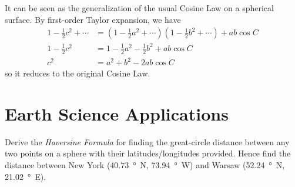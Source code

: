 It can be seen as the generalization of the usual Cosine Law on a spherical surface. By first-order Taylor expansion, we have
\begin{align*}
1-\frac{1}{2}c^2 + \cdots &= (1-\frac{1}{2}a^2 + \cdots)(1-\frac{1}{2}b^2 + \cdots) + ab \cos C \\
1-\frac{1}{2}c^2 &= 1 - \frac{1}{2}a^2 - \frac{1}{2} b^2 + ab \cos C \\
c^2 &= a^2 + b^2 - 2ab \cos C
\end{align*}
so it reduces to the original Cosine Law.

\section{Earth Science Applications}
\begin{exmp}
\label{exmp:Haversine}
Derive the \textit{Haversine Formula} for finding the great-circle distance between any two points on a sphere with their latitudes/longitudes provided. Hence find the distance between New York (\SI{40.73}{\degree N}, \SI{73.94}{\degree W}) and Warsaw (\SI{52.24}{\degree N}, \SI{21.02}{\degree E}).
\end{exmp}
